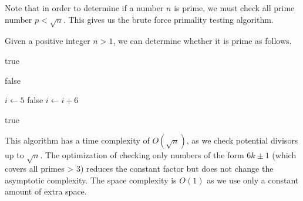   Note that in order to determine if a number $n$ is prime, we must check all prime number $p < \sqrt{n}$. This gives us the brute force primality testing algorithm. 

  \begin{algo}
    Given a positive integer $n > 1$, we can determine whether it is prime as follows.
    \begin{algorithmic}[1]
       
         
          \State \Return true
        \EndIf
        
         
          \State \Return false
        \EndIf
        
        \State $i \gets 5$ 
         
           
            \State \Return false 
          \EndIf
          \State $i \gets i + 6$ 
        \EndWhile
        
        \State \Return true 
      \EndProcedure
    \end{algorithmic}
    This algorithm has a time complexity of $O(\sqrt{n})$, as we check potential divisors up to $\sqrt{n}$. The optimization of checking only numbers of the form $6k \pm 1$ (which covers all primes > 3) reduces the constant factor but does not change the asymptotic complexity. The space complexity is $O(1)$ as we use only a constant amount of extra space.
  \end{algo}

